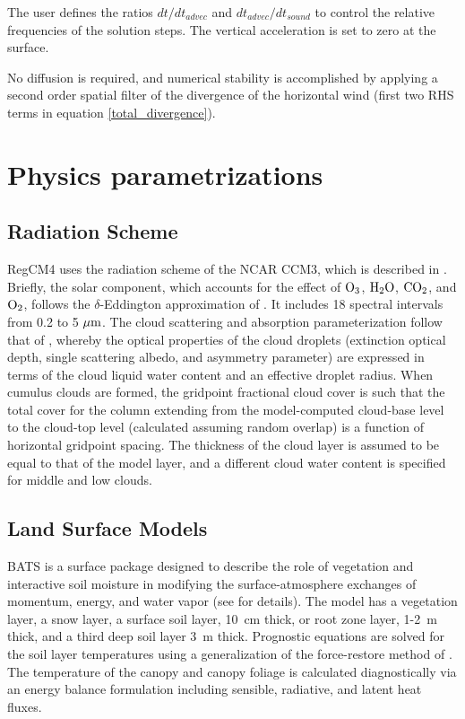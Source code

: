 The user defines the ratios $dt/dt_{advec}$ and $dt_{advec}/dt_{sound}$ to
control the relative frequencies of the solution steps. The vertical
acceleration is set to zero at the surface.

No diffusion is required, and numerical stability is accomplished by
applying a second order spatial filter of the divergence of the
horizontal wind (first two RHS terms in equation \ref{total_divergence}).

\section{Physics parametrizations} \label{sec:physics}

\subsection{Radiation Scheme}

\noindent \ac{RegCM}4 uses the radiation scheme of
the \ac{NCAR} CCM3, which is described in \cite{Kiehl_96}.  Briefly, the solar
component, which accounts for the effect of ${\rm O_3}$, ${\rm H_2O}$, ${\rm
CO_2}$, and ${\rm O_2}$, follows the $\delta$-Eddington approximation of
\cite{Kiehl_96}.  It includes 18 spectral intervals from 0.2 to 5 $\mu {\rm m}$.
The cloud scattering and absorption parameterization follow that of
\cite{Slingo_89}, whereby the optical properties of the cloud droplets
(extinction optical depth, single scattering albedo, and asymmetry parameter)
are expressed in terms of the cloud liquid water content and an effective
droplet radius.  When cumulus clouds are formed, the gridpoint fractional cloud
cover is such that the total cover for the column extending from the
model-computed cloud-base level to the cloud-top level (calculated assuming
random overlap) is a function of horizontal gridpoint spacing.  The thickness of
the cloud layer is assumed to be equal to that of the model layer, and a
different cloud water content is specified for middle and low clouds.

\subsection{Land Surface Models}

 BATS is a surface package designed to describe
the role of vegetation and interactive soil moisture in modifying the
surface-atmosphere exchanges of momentum, energy, and water vapor (see
\cite{Dickinson_93} for details).  The model has a vegetation layer, a snow
layer, a surface soil layer, 10~cm thick, or root zone layer, 1-2~m thick, and a
third deep soil layer 3~m thick.  Prognostic equations are solved for the soil
layer temperatures using a generalization of the force-restore method of
\cite{Deardoff_78}.  The temperature of the canopy and canopy foliage is
calculated diagnostically via an energy balance formulation including sensible,
radiative, and latent heat fluxes.

